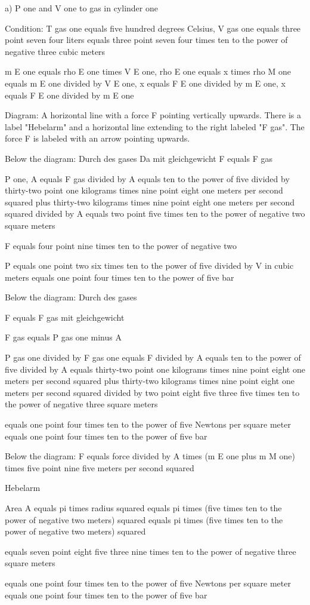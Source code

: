 a) P one and V one to gas in cylinder one

Condition: T gas one equals five hundred degrees Celsius, V gas one equals three point seven four liters equals three point seven four times ten to the power of negative three cubic meters

m E one equals rho E one times V E one, rho E one equals x times rho M one equals m E one divided by V E one, x equals F E one divided by m E one, x equals F E one divided by m E one

Diagram: 
A horizontal line with a force F pointing vertically upwards. There is a label "Hebelarm" and a horizontal line extending to the right labeled "F gas". The force F is labeled with an arrow pointing upwards.

Below the diagram: 
Durch des gases
Da mit gleichgewicht F equals F gas

P one, A equals F gas divided by A equals ten to the power of five divided by thirty-two point one kilograms times nine point eight one meters per second squared plus thirty-two kilograms times nine point eight one meters per second squared divided by A equals two point five times ten to the power of negative two square meters

F equals four point nine times ten to the power of negative two

P equals one point two six times ten to the power of five divided by V in cubic meters equals one point four times ten to the power of five bar

Below the diagram: 
Durch des gases

F equals F gas mit gleichgewicht

F gas equals P gas one minus A

P gas one divided by F gas one equals F divided by A equals ten to the power of five divided by A equals thirty-two point one kilograms times nine point eight one meters per second squared plus thirty-two kilograms times nine point eight one meters per second squared divided by two point eight five three five times ten to the power of negative three square meters

equals one point four times ten to the power of five Newtons per square meter equals one point four times ten to the power of five bar

Below the diagram: 
F equals force divided by A times (m E one plus m M one) times five point nine five meters per second squared

Hebelarm

Area A equals pi times radius squared equals pi times (five times ten to the power of negative two meters) squared equals pi times (five times ten to the power of negative two meters) squared

equals seven point eight five three nine times ten to the power of negative three square meters

equals one point four times ten to the power of five Newtons per square meter equals one point four times ten to the power of five bar